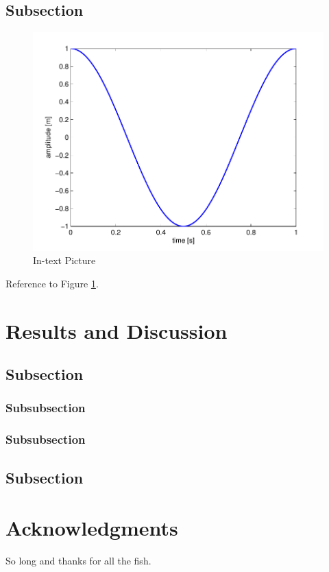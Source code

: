 \documentclass[fleqn,10pt,lineno]{wlpeerj} %
\begin{document}
\subsection*{Subsection}

\lipsum[9] %

\begin{figure}[ht]\centering
\includegraphics[width=\linewidth]{results}
\caption{In-text Picture}
\label{fig:results}
\end{figure}

Reference to Figure \ref{fig:results}.

\section*{Results and Discussion}

\lipsum[10] %

\subsection*{Subsection}

\lipsum[11] %

\subsubsection*{Subsubsection}

\lipsum[12] %

\subsubsection*{Subsubsection}

\lipsum[14] %

\subsection*{Subsection}

\lipsum[15-20] %

\section*{Acknowledgments}

So long and thanks for all the fish.


\end{document}

